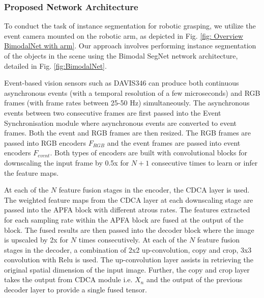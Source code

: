 \documentclass[lettersize,journal]{IEEEtran}
\begin{document}
\subsubsection{\textbf{Proposed Network Architecture}}
\label{subsubsection : Proposed Network Architecture}




To conduct the task of instance segmentation for robotic grasping, we utilize the event camera mounted on the robotic arm, as depicted in Fig. \ref{fig: Overview BimodalNet with arm}. Our approach involves performing instance segmentation of the objects in the scene using the Bimodal SegNet network architecture, detailed in Fig. \ref{fig:BimodalNet}.





Event-based vision sensors such as DAVIS346 can produce both continuous asynchronous events (with a temporal resolution of a few microseconds) and RGB frames (with frame rates between 25-50 Hz) simultaneously. The asynchronous events between two consecutive frames are first passed into the Event Synchronisation module where asynchronous events are converted to event frames. Both the event and RGB frames are then resized. The RGB frames are passed into RGB encoders $F_{RGB}$ and the event frames are passed into event encoders $F_{event}$. Both types of encoders are built with convolutional blocks for downscaling the input frame by 0.5x for $N+1$ consecutive times to learn or infer the feature maps. 

At each of the $N$ feature fusion stages in the encoder, the CDCA layer is used. The weighted feature maps from the CDCA layer at each downscaling stage are passed into the APFA block with different atrous rates. The features extracted for each sampling rate within the APFA block are fused at the output of the block. The fused results are then passed into the decoder block where the image is upscaled by 2x for $N$ times consecutively. At each of the $N$  feature fusion stages in the decoder, a combination of 2x2 up-convolution, copy and crop, 3x3 convolution with Relu is used. The up-convolution layer assists in retrieving the original spatial dimension of the input image. Further, the copy and crop layer takes the output from CDCA module i.e. $X_n$ and the output of the previous decoder layer to provide a single fused tensor.  
\end{document}
